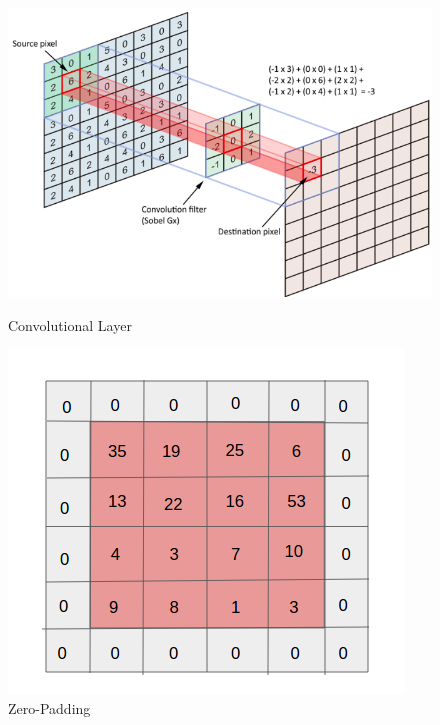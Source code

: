 \begin{figure}
	\begin{minipage}[b]{.55\linewidth} %
		\includegraphics[width=\linewidth]{Bilder/convolutional_layer.png}
		\caption[Convolutional Layer]{Convolutional Layer \cite{DaphneCornelisse.20180424}}
		\label{convolutional_layer}
	\end{minipage}
	\hspace{.05\linewidth}%
	\begin{minipage}[b]{.4\linewidth} %
		\includegraphics[width=\linewidth]{Bilder/zero_padding.png}
		\caption[Zero-Padding]{Zero-Padding \cite{AbhineetSaxena.20160629}}
		\label{zero_padding}
	\end{minipage}
\end{figure}

